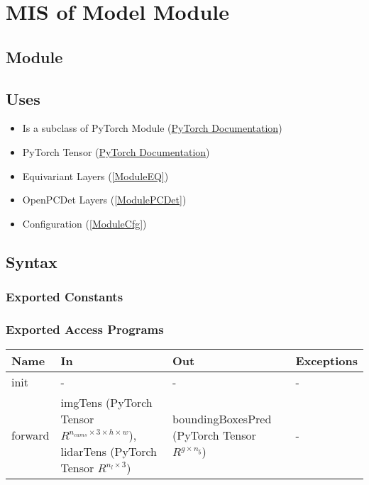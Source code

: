 \documentclass[12pt, titlepage]{article}
\begin{document}
\section{MIS of Model Module} \label{ModuleModel} 

\subsection{Module}

\subsection{Uses}
\begin{itemize}
  \item Is a subclass of PyTorch Module (\href{https://pytorch.org/docs/stable/generated/torch.nn.Module.html}{PyTorch Documentation})
  \item PyTorch Tensor (\href{https://pytorch.org/docs/stable/tensors.html}{PyTorch Documentation})
  \item Equivariant Layers (\ref{ModuleEQ})
  \item OpenPCDet Layers (\ref{ModulePCDet})
  \item Configuration (\ref{ModuleCfg})
\end{itemize}

\subsection{Syntax}

\subsubsection{Exported Constants}

\subsubsection{Exported Access Programs}

\begin{center}
  \begin{tabular}{p{2cm}|p{4cm}|p{4cm}|p{2cm}}
  \hline
  \textbf{Name} & \textbf{In} & \textbf{Out} & \textbf{Exceptions} \\
  \hline
  init & - & - & - \\
  \hline
  forward & imgTens (PyTorch Tensor $R^{n_{cams}\times{}3\times{}h\times{}w}$), lidarTens (PyTorch Tensor $R^{n_{l}\times{}3}$) & boundingBoxesPred (PyTorch Tensor $R^{g\times{}n_{\hat{b}}}$) & - \\
  \hline
  \end{tabular}
\end{center}
\end{document}
